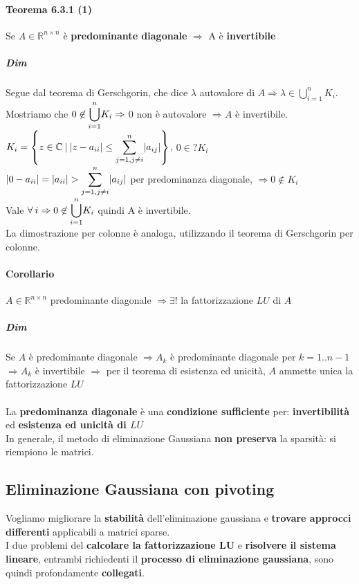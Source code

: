 \documentclass[10pt]{book}
\begin{document}
\paragraph{Teorema 6.3.1 (1)} Se $A \in \mathbb{R}^{n \times n}$ è \textbf{predominante diagonale} $\Rightarrow$ A è \textbf{invertibile}
\subparagraph{Dim} Segue dal teorema di Gerschgorin, che dice $\lambda$ autovalore di $A \Rightarrow \lambda \in \bigcup_{i=1}^n K_i$.\\
Mostriamo che $0 \not\in \mathlarger{\bigcup_{i=1}^n} K_i \Rightarrow$ 0 non è autovalore $\Rightarrow A$ è invertibile.\\
$K_i = \left\{ z \in \mathbb{C}\: |\: |z - a_{ii}| \leq \mathlarger{\sum_{j=1, j\neq i}^n} |a_{ij}|\right\}$, $0 \in? K_i$\\
$|0 - a_{ii}| = |a_{ii}| > \mathlarger{\sum_{j=1, j\neq i}^n} |a_{ij}|$ per predominanza diagonale, $\Rightarrow 0 \not\in K_i$\\
Vale $\forall\: i \Rightarrow 0 \not\in \mathlarger{\bigcup_{i=1}^n} K_i$ quindi A è invertibile.\\
La dimostrazione per colonne è analoga, utilizzando il teorema di Gerschgorin per colonne.
\paragraph{Corollario} $A \in \mathbb{R}^{n \times n}$ predominante diagonale $\Rightarrow \exists!$ la fattorizzazione $LU$ di $A$
\subparagraph{Dim} Se $A$ è predominante diagonale $\Rightarrow A_k$ è predominante diagonale per $k = 1 .. n-1$\\
$\Rightarrow A_k$ è invertibile $\Rightarrow$ per il teorema di esistenza ed unicità, $A$ ammette unica la fattorizzazione $LU$
\paragraph{} La \textbf{predominanza diagonale} è una \textbf{condizione sufficiente} per: \textbf{invertibilità} ed \textbf{esistenza ed unicità di $LU$}\\
In generale, il metodo di eliminazione Gaussiana \textbf{non preserva} la sparsità: si riempiono le matrici.
\subsection{Eliminazione Gaussiana con pivoting}
Vogliamo migliorare la \textbf{stabilità} dell'eliminazione gaussiana e \textbf{trovare approcci differenti} applicabili a matrici sparse.\\
I due problemi del \textbf{calcolare la fattorizzazione LU} e \textbf{risolvere il sistema lineare}, entrambi richiedenti il \textbf{processo di eliminazione gaussiana}, sono quindi profondamente \textbf{collegati}.
\end{document}
